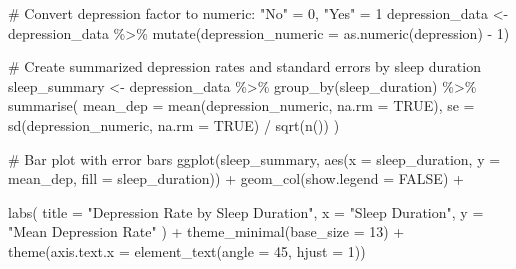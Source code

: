 \documentclass[
  letterpaper,
  DIV=11,
  numbers=noendperiod]{scrartcl}
\newenvironment{Shaded}{\begin{snugshade}}{\end{snugshade}}
\newcommand{\AttributeTok}[1]{\textcolor[rgb]{0.40,0.45,0.13}{#1}}
\newcommand{\CommentTok}[1]{\textcolor[rgb]{0.37,0.37,0.37}{#1}}
\newcommand{\ConstantTok}[1]{\textcolor[rgb]{0.56,0.35,0.01}{#1}}
\newcommand{\DecValTok}[1]{\textcolor[rgb]{0.68,0.00,0.00}{#1}}
\newcommand{\FunctionTok}[1]{\textcolor[rgb]{0.28,0.35,0.67}{#1}}
\newcommand{\NormalTok}[1]{\textcolor[rgb]{0.00,0.23,0.31}{#1}}
\newcommand{\OtherTok}[1]{\textcolor[rgb]{0.00,0.23,0.31}{#1}}
\newcommand{\SpecialCharTok}[1]{\textcolor[rgb]{0.37,0.37,0.37}{#1}}
\newcommand{\StringTok}[1]{\textcolor[rgb]{0.13,0.47,0.30}{#1}}
\begin{document}
\begin{Shaded}
\begin{Highlighting}[numbers=left,,]
\CommentTok{\# Convert \textquotesingle{}depression\textquotesingle{} factor to numeric: "No" = 0, "Yes" = 1}
\NormalTok{depression\_data }\OtherTok{\textless{}{-}}\NormalTok{ depression\_data }\SpecialCharTok{\%\textgreater{}\%}
  \FunctionTok{mutate}\NormalTok{(}\AttributeTok{depression\_numeric =} \FunctionTok{as.numeric}\NormalTok{(depression) }\SpecialCharTok{{-}} \DecValTok{1}\NormalTok{)}

\CommentTok{\# Create summarized depression rates and standard errors by sleep duration}
\NormalTok{sleep\_summary }\OtherTok{\textless{}{-}}\NormalTok{ depression\_data }\SpecialCharTok{\%\textgreater{}\%}
  \FunctionTok{group\_by}\NormalTok{(sleep\_duration) }\SpecialCharTok{\%\textgreater{}\%}
  \FunctionTok{summarise}\NormalTok{(}
    \AttributeTok{mean\_dep =} \FunctionTok{mean}\NormalTok{(depression\_numeric, }\AttributeTok{na.rm =} \ConstantTok{TRUE}\NormalTok{),}
    \AttributeTok{se =} \FunctionTok{sd}\NormalTok{(depression\_numeric, }\AttributeTok{na.rm =} \ConstantTok{TRUE}\NormalTok{) }\SpecialCharTok{/} \FunctionTok{sqrt}\NormalTok{(}\FunctionTok{n}\NormalTok{())}
\NormalTok{  )}

\CommentTok{\# Bar plot with error bars}
\FunctionTok{ggplot}\NormalTok{(sleep\_summary, }\FunctionTok{aes}\NormalTok{(}\AttributeTok{x =}\NormalTok{ sleep\_duration, }\AttributeTok{y =}\NormalTok{ mean\_dep, }\AttributeTok{fill =}\NormalTok{ sleep\_duration)) }\SpecialCharTok{+}
  \FunctionTok{geom\_col}\NormalTok{(}\AttributeTok{show.legend =} \ConstantTok{FALSE}\NormalTok{) }\SpecialCharTok{+}

  \FunctionTok{labs}\NormalTok{(}
    \AttributeTok{title =} \StringTok{"Depression Rate by Sleep Duration"}\NormalTok{,}
    \AttributeTok{x =} \StringTok{"Sleep Duration"}\NormalTok{,}
    \AttributeTok{y =} \StringTok{"Mean Depression Rate"}
\NormalTok{  ) }\SpecialCharTok{+}
  \FunctionTok{theme\_minimal}\NormalTok{(}\AttributeTok{base\_size =} \DecValTok{13}\NormalTok{) }\SpecialCharTok{+}
  \FunctionTok{theme}\NormalTok{(}\AttributeTok{axis.text.x =} \FunctionTok{element\_text}\NormalTok{(}\AttributeTok{angle =} \DecValTok{45}\NormalTok{, }\AttributeTok{hjust =} \DecValTok{1}\NormalTok{))}
\end{Highlighting}
\end{Shaded}
\end{document}
